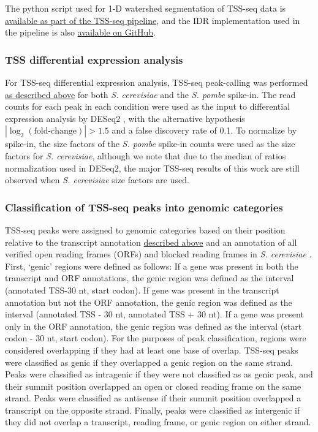The python script used for 1-D watershed segmentation of TSS-seq data is \href{https://github.com/winston-lab/tss-seq/blob/master/scripts/tss_peakcalling.py}{available as part of the TSS-seq pipeline}, and the IDR implementation used in the pipeline is also \href{https://github.com/nboley/idr}{available on GitHub}.

\subsubsection{TSS differential expression analysis}
\label{subsubsec:tss_differential_expression}

For TSS-seq differential expression analysis, TSS-seq peak-calling was performed \hyperref[subsubsec:tss_peak_calling]{as described above} for both \textit{S. cerevisiae} and the \textit{S. pombe} spike-in.
The read counts for each peak in each condition were used as the input to differential expression analysis by DESeq2 \citep{love2014}, with the alternative hypothesis $\allowbreak \left\lvert\log_2 \left(\text{fold-change}\right) \right\rvert > 1.5$ and a false discovery rate of 0.1.
To normalize by spike-in, the size factors of the \textit{S. pombe} spike-in counts were used as the size factors for \textit{S. cerevisiae}, although we note that due to the median of ratios normalization used in DESeq2, the major TSS-seq results of this work are still observed when \textit{S. cerevisiae} size factors are used.

\subsubsection{Classification of TSS-seq peaks into genomic categories}
\label{subsubsec:tss_peak_classification}

TSS-seq peaks were assigned to genomic categories based on their position relative to the transcript annotation \hyperref[subsubsec:tss_reannotation]{described above} and an annotation of all verified open reading frames (ORFs) and blocked reading frames in \textit{S. cerevisiae} \citep{engel2014}.
First, `genic' regions were defined as follows: If a gene was present in both the transcript and ORF annotations, the genic region was defined as the interval (annotated TSS-30 nt, start codon).
If gene was present in the transcript annotation but not the ORF annotation, the genic region was defined as the interval (annotated TSS - 30 nt, annotated TSS + 30 nt).
If a gene was present only in the ORF annotation, the genic region was defined as the interval (start codon - 30 nt, start codon).
For the purposes of peak classification, regions were considered overlapping if they had at least one base of overlap.
TSS-seq peaks were classified as genic if they overlapped a genic region on the same strand.
Peaks were classified as intragenic if they were not classified as as genic peak, and their summit position overlapped an open or closed reading frame on the same strand.
Peaks were classified as antisense if their summit position overlapped a transcript on the opposite strand.
Finally, peaks were classified as intergenic if they did not overlap a transcript, reading frame, or genic region on either strand.

